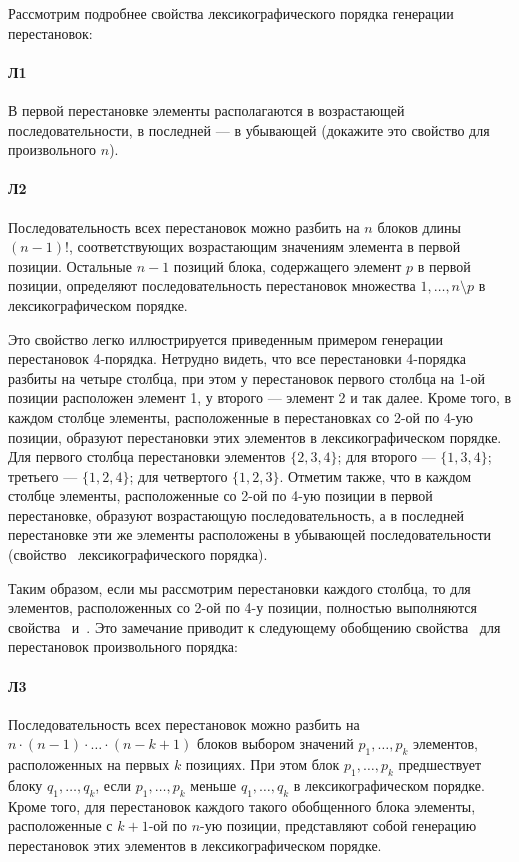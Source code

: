 \documentclass[12pt,a4paper]{article}
\theoremstyle{plain}
\theoremstyle{definition}
\theoremstyle{remark}
\begin{document}
Рассмотрим подробнее свойства лексикографического порядка генерации перестановок:

\paragraph*{Л1}
\label{L1}
В первой перестановке элементы располагаются в возрастающей последовательности, в последней --- в убывающей (докажите это свойство для произвольного $n$).

\paragraph*{Л2}
\label{L2}
Последовательность всех перестановок можно разбить на $n$ блоков длины $(n-1)!$, соответствующих возрастающим значениям элемента в первой позиции. Остальные $n-1$ позиций блока, содержащего элемент $p$ в первой позиции, определяют последовательность перестановок множества ${1,\ldots,n}\setminus {p}$ в
лексикографическом порядке.

Это свойство легко иллюстрируется приведенным примером генерации перестановок 4-порядка. Нетрудно видеть, что все перестановки 4-порядка разбиты на четыре столбца, при этом у перестановок первого столбца на 1-ой позиции расположен элемент 1, у второго --- элемент 2 и так далее. Кроме того, в каждом столбце элементы, расположенные в перестановках со 2-ой по 4-ую позиции, образуют перестановки этих элементов в лексикографическом порядке. Для первого столбца перестановки элементов $\{2,3,4\}$; для второго --- $\{1,3,4\}$; третьего --- $\{1,2,4\}$; для четвертого $\{1,2,3\}$. Отметим также, что в каждом столбце элементы, расположенные со 2-ой по 4-ую позиции в первой перестановке, образуют возрастающую последовательность, а в последней перестановке эти же элементы расположены в убывающей последовательности (свойство~ лексикографического порядка).

Таким образом, если мы рассмотрим перестановки каждого столбца, то для элементов, расположенных со 2-ой по 4-у позиции, полностью выполняются свойства~ и~. Это замечание приводит к следующему обобщению свойства~ для перестановок произвольного порядка:

\paragraph*{Л3}
\label{L3}
Последовательность всех перестановок можно разбить на $n\cdot(n-1)\cdot\ldots\cdot(n-k+1)$ блоков выбором значений $p_1,\ldots,p_k$ элементов, расположенных на первых $k$ позициях. При этом блок $p_1,\ldots,p_k$ предшествует блоку $q_1,\ldots,q_k$, если $p_1,\ldots,p_k$ меньше $q_1,\ldots,q_k$ в лексикографическом порядке. Кроме того, для перестановок каждого такого обобщенного блока элементы, расположенные с $k+1$-ой по $n$-ую позиции, представляют собой генерацию перестановок этих элементов в лексикографическом порядке. 
\end{document}
